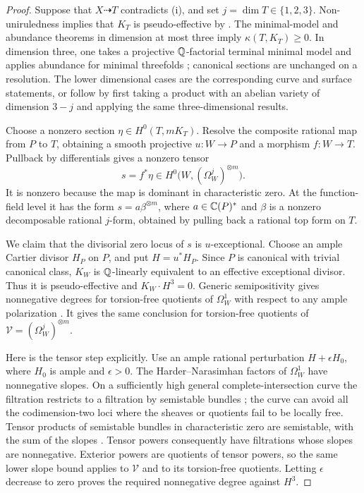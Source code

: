 \begin{proof}
Suppose that \(X\dashrightarrow T\) contradicts (i), and set
\(j=\dim T\in\{1,2,3\}\).  Non-uniruledness implies that \(K_T\) is
pseudo-effective by \cite{BDPP2013}.  The minimal-model and abundance
theorems in dimension at most three imply \(\kappa(T,K_T)\ge0\).
In dimension three, one takes a projective \(\mathbb Q\)-factorial terminal
minimal model and applies abundance for minimal threefolds
\cite{FlipsAbundance1992,Kawamata1992}; canonical sections are unchanged
on a resolution.  The lower dimensional cases are the corresponding
curve and surface statements, or follow by first taking a product with
an abelian variety of dimension \(3-j\) and applying the same
three-dimensional results.

Choose a nonzero section \(\eta\in H^0(T,mK_T)\).  Resolve the composite
rational map from \(P\) to \(T\), obtaining a smooth projective
\(u:W\to P\) and a morphism \(f:W\to T\).  Pullback by differentials
gives a nonzero tensor
\begin{equation}\label{eq:index-pulled-tensor}
         s=f^*\eta\in H^0\bigl(W,(\Omega_W^j)^{\otimes m}\bigr).
\end{equation}
It is nonzero because the map is dominant in characteristic zero.
At the function-field level it has the form
\(s=a\beta^{\otimes m}\), where \(a\in\mathbb C(P)^*\) and \(\beta\) is a
nonzero decomposable rational \(j\)-form, obtained by pulling back a
rational top form on \(T\).

We claim that the divisorial zero locus of \(s\) is \(u\)-exceptional.
Choose an ample Cartier divisor \(H_P\) on \(P\), and put
\(H=u^*H_P\).  Since \(P\) is canonical with trivial canonical class,
\(K_W\) is \(\mathbb Q\)-linearly equivalent to an effective exceptional
divisor.  Thus it is pseudo-effective and \(K_W\cdot H^3=0\).
Generic semipositivity gives nonnegative degrees for torsion-free
quotients of \(\Omega_W^1\) with respect to any ample polarization
\cite[Theorem~2.1]{CampanaPaun2015}.  It gives the same conclusion for
torsion-free quotients of
\(\mathcal V=(\Omega_W^j)^{\otimes m}\).

Here is the tensor step explicitly.  Use an ample rational perturbation
\(H+\epsilon H_0\), where \(H_0\) is ample and \(\epsilon>0\).
The Harder--Narasimhan factors of \(\Omega_W^1\) have nonnegative slopes.
On a sufficiently high general complete-intersection curve the
filtration restricts to a filtration by semistable bundles
\cite[Theorem~6.1]{MehtaRamanathan1982}; the curve can avoid all the
codimension-two loci where the sheaves or quotients fail to be locally
free.  Tensor products of semistable bundles in characteristic zero
are semistable, with the sum of the slopes
\cite[Theorem~3.18]{RamananRamanathan1984}.  Tensor powers consequently
have filtrations whose slopes are nonnegative.  Exterior powers are
quotients of tensor powers, so the same lower slope bound applies to
\(\mathcal V\) and to its torsion-free quotients.  Letting
\(\epsilon\) decrease to zero proves the required nonnegative degree
against \(H^3\).


\end{proof}
